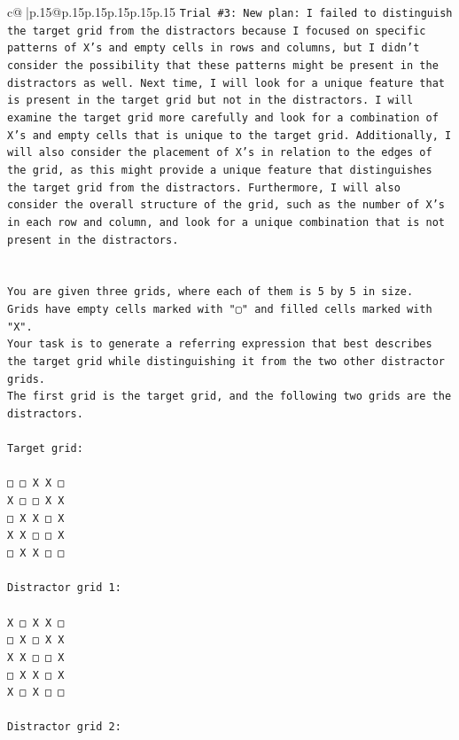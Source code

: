 \documentclass{article}
\begin{document}
{\begin{supertabular}{c@{$\;$}|p{.15\linewidth}@{}p{.15\linewidth}p{.15\linewidth}p{.15\linewidth}p{.15\linewidth}p{.15\linewidth}}
{{{\texttt{Trial \#3: New plan: I failed to distinguish the target grid from the distractors because I focused on specific patterns of X's and empty cells in rows and columns, but I didn't consider the possibility that these patterns might be present in the distractors as well. Next time, I will look for a unique feature that is present in the target grid but not in the distractors. I will examine the target grid more carefully and look for a combination of X's and empty cells that is unique to the target grid. Additionally, I will also consider the placement of X's in relation to the edges of the grid, as this might provide a unique feature that distinguishes the target grid from the distractors. Furthermore, I will also consider the overall structure of the grid, such as the number of X's in each row and column, and look for a unique combination that is not present in the distractors.} \\
\\ 
\\ 
\texttt{You are given three grids, where each of them is 5 by 5 in size.} \\
\texttt{Grids have empty cells marked with "▢" and filled cells marked with "X".} \\
\texttt{Your task is to generate a referring expression that best describes the target grid while distinguishing it from the two other distractor grids.} \\
\texttt{The first grid is the target grid, and the following two grids are the distractors.} \\
\\ 
\texttt{Target grid:} \\
\\ 
\texttt{□ □ X X □} \\
\texttt{X □ □ X X} \\
\texttt{□ X X □ X} \\
\texttt{X X □ □ X} \\
\texttt{□ X X □ □} \\
\\ 
\texttt{Distractor grid 1:} \\
\\ 
\texttt{X □ X X □} \\
\texttt{□ X □ X X} \\
\texttt{X X □ □ X} \\
\texttt{□ X X □ X} \\
\texttt{X □ X □ □} \\
\\ 
\texttt{Distractor grid 2:} \\
}}}
\end{supertabular}}
\end{document}
